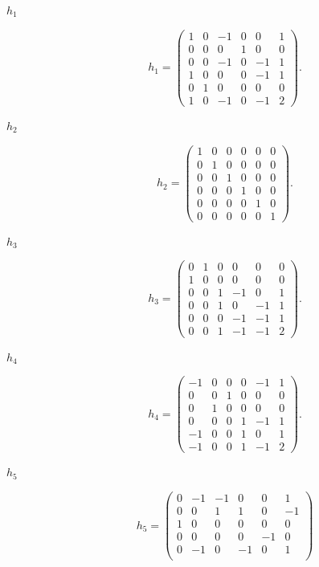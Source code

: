 \begin{description}
\item[$h_{1}$] 
\[
h_{1}=\begin{pmatrix}
1 & 0 & -1 & 0 & 0 & 1 \\
0 & 0 & 0 & 1 & 0 & 0 \\
0 & 0 & -1 & 0 & -1 & 1 \\
1 & 0 & 0 & 0 & -1 & 1 \\
0 & 1 & 0 & 0 & 0 & 0 \\
1 & 0 & -1 & 0 & -1 & 2
\end{pmatrix}.
\]
\item[$h_{2}$] 
\[
h_{2}=\begin{pmatrix}
1 & 0 & 0 & 0 & 0 & 0 \\
0 & 1 & 0 & 0 & 0 & 0 \\
0 & 0 & 1 & 0 & 0 & 0 \\
0 & 0 & 0 & 1 & 0 & 0 \\
0 & 0 & 0 & 0 & 1 & 0 \\
0 & 0 & 0 & 0 & 0 & 1
\end{pmatrix}.
\]
\item[$h_{3}$] 
\[
h_{3}=\begin{pmatrix}
0 & 1 & 0 & 0 & 0 & 0 \\
1 & 0 & 0 & 0 & 0 & 0 \\
0 & 0 & 1 & -1 & 0 & 1 \\
0 & 0 & 1 & 0 & -1 & 1 \\
0 & 0 & 0 & -1 & -1 & 1 \\
0 & 0 & 1 & -1 & -1 & 2
\end{pmatrix}.
\]
\item[$h_{4}$] 
\[
h_{4}=\begin{pmatrix}
-1 & 0 & 0 & 0 & -1 & 1 \\
0 & 0 & 1 & 0 & 0 & 0 \\
0 & 1 & 0 & 0 & 0 & 0 \\
0 & 0 & 0 & 1 & -1 & 1 \\
-1 & 0 & 0 & 1 & 0 & 1 \\
-1 & 0 & 0 & 1 & -1 & 2
\end{pmatrix}.
\]
\item[$h_{5}$] 
\[
h_{5}=\begin{pmatrix}
0 & -1 & -1 & 0 & 0 & 1 \\
0 & 0 & 1 & 1 & 0 & -1 \\
1 & 0 & 0 & 0 & 0 & 0 \\
0 & 0 & 0 & 0 & -1 & 0 \\
0 & -1 & 0 & -1 & 0 & 1 \\

\end{pmatrix}\]
\end{description}
